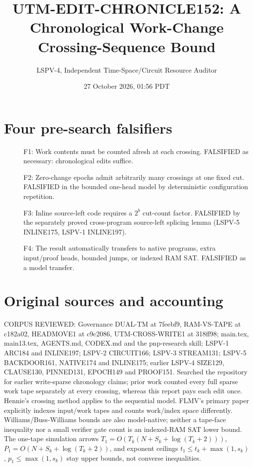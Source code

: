 \documentclass[11pt]{article}
\title{UTM-EDIT-CHRONICLE152: A Chronological Work-Change Crossing-Sequence Bound}
\author{LSPV-4, Independent Time-Space/Circuit Resource Auditor}
\date{27 October 2026, 01:56 PDT}
\begin{document}
\maketitle
\begin{center}\end{center}
\section{Four pre-search falsifiers}
\begin{description}
\item[] F1: Work contents must be counted afresh at each crossing. FALSIFIED as necessary: chronological edits suffice.
\item[] F2: Zero-change epochs admit arbitrarily many crossings at one fixed cut. FALSIFIED in the bounded one-head model by deterministic configuration repetition.
\item[] F3: Inline source-left code requires a $2^b$ cut-count factor. FALSIFIED by the separately proved cross-program source-left splicing lemma (LSPV-5 INLINE175, LSPV-1 INLINE197).
\item[] F4: The result automatically transfers to native programs, extra input/proof heads, bounded jumps, or indexed RAM SAT. FALSIFIED as a model transfer.
\end{description}
\section{Original sources and accounting}
CORPUS REVIEWED: Governance DUAL-TM at 7feebf9, RAM-VS-TAPE at c182a02, HEADMOVE1 at c9c2086, UTM-CROSS-WRITE1 at 318ff98; main.tex, main13.tex, AGENTS.md, CODEX.md and the pnp-research skill; LSPV-1 ARC184 and INLINE197; LSPV-2 CIRCUIT166; LSPV-3 STREAM131; LSPV-5 BACKDOOR161, NATIVE174 and INLINE175; earlier LSPV-4 SIZE129, CLAUSE130, PINNED131, EPOCH149 and PROOF151. Searched the repository for earlier write-sparse chronology claims; prior work counted every full sparse work tape separately at every crossing, whereas this report pays each edit once. Hennie's crossing method applies to the sequential model. FLMV's primary paper explicitly indexes input/work tapes and counts work/index space differently. Williams/Buss-Williams bounds are also model-native; neither a tape-face inequality nor a small verifier gate count is an indexed-RAM SAT lower bound. The one-tape simulation arrows $T_1=O(T_k(N+S_k+\log(T_k+2)))$, $P_1=O(N+S_k+\log(T_k+2))$, and exponent ceilings $t_1\le t_k+\max(1,s_k)$, $p_1\le\max(1,s_k)$ stay upper bounds, not converse inequalities.
\end{document}
